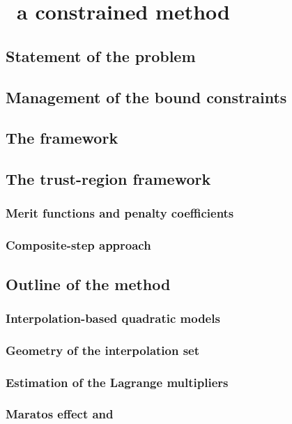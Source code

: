 %
%
%
\chapter{ \textemdash\ a constrained  method}
\label{ch:cobyqa-intro}

\section{Statement of the problem}

\section{Management of the bound constraints}

\section{The  framework}

\section{The trust-region framework}

\subsection{Merit functions and penalty coefficients}

\subsection{Composite-step approach}

\section{Outline of the  method}

\subsection{Interpolation-based quadratic models}

\subsection{Geometry of the interpolation set}

\subsection{Estimation of the Lagrange multipliers}

\subsection{Maratos effect and }
